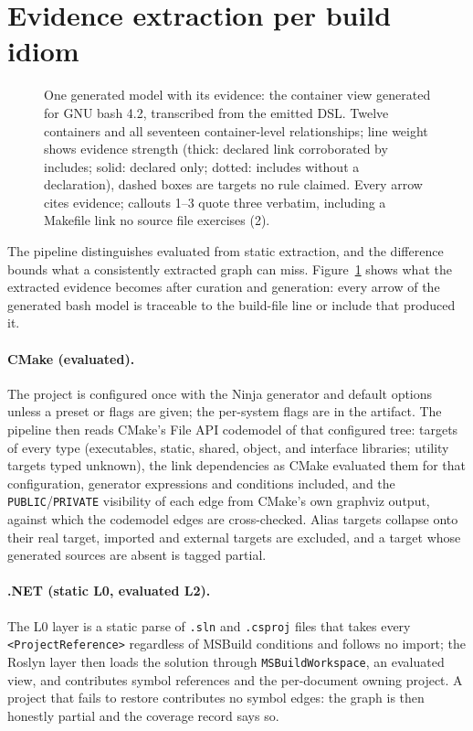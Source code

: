 \documentclass[10pt,conference]{IEEEtran}
\begin{document}
\section{Evidence extraction per build idiom}
\label{sec:tr-extract}

\begin{figure}[t]
  \centering
  \resizebox{\columnwidth}{!}{}
  \caption{One generated model with its evidence: the container view generated for GNU bash 4.2,
  transcribed from the emitted DSL. Twelve containers and all seventeen container-level
  relationships; line weight shows evidence strength (thick: declared link corroborated by
  includes; solid: declared only; dotted: includes without a declaration), dashed boxes are
  targets no rule claimed. Every arrow cites evidence; callouts 1--3 quote three verbatim,
  including a Makefile link no source file exercises (2).}
  \label{fig:model}
\end{figure}

The pipeline distinguishes evaluated from static extraction, and the difference bounds what a
consistently extracted graph can miss. Figure~\ref{fig:model} shows what the extracted evidence
becomes after curation and generation: every arrow of the generated bash model is traceable to
the build-file line or include that produced it.

\paragraph{CMake (evaluated).} The project is configured once with the Ninja generator and
default options unless a preset or flags are given; the per-system flags are in the artifact. The
pipeline then reads CMake's File API codemodel of that configured tree: targets of every type
(executables, static, shared, object, and interface libraries; utility targets typed unknown), the
link dependencies as CMake evaluated them for that configuration, generator expressions and
conditions included, and the \texttt{PUBLIC}/\texttt{PRIVATE} visibility of each edge from CMake's
own graphviz output, against which the codemodel edges are cross-checked. Alias targets collapse
onto their real target, imported and external targets are excluded, and a target whose generated
sources are absent is tagged partial.

\paragraph{.NET (static L0, evaluated L2).} The L0 layer is a static parse of \texttt{.sln} and
\texttt{.csproj} files that takes every \texttt{<ProjectReference>} regardless of MSBuild
conditions and follows no import; the Roslyn layer then loads the solution through
\texttt{MSBuildWorkspace}, an evaluated view, and contributes symbol references and the per-document
owning project. A project that fails to restore contributes no symbol edges: the graph is then
honestly partial and the coverage record says so.
\end{document}
